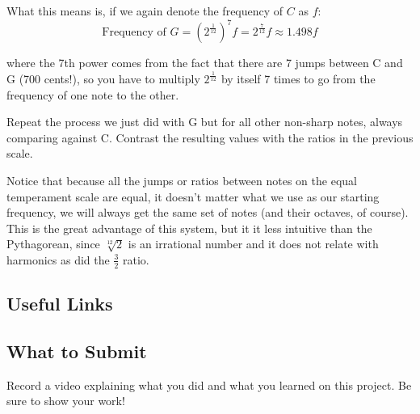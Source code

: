 \documentclass[12pt,noauthor,nooutcomes,hints,instructornotes]{ximera}%
\begin{document}
What this means is, if we again denote the frequency of $C$ as $f$:
\[
\text{Frequency of } G =\left(2^{\frac{1}{12}}\right)^7f=2^\frac{7}{12}f\approx 1.498f
\]

where the 7th power comes from the fact that there are 7 jumps between C and G (700 cents!), so you have to multiply $2^{\frac{1}{12}}$ by itself 7 times to go from the frequency of one note to the other.

\begin{question} Repeat the process we just did with G but for all other non-sharp notes, always comparing against C. Contrast the resulting values with the ratios in the previous scale.
\end{question} 

Notice that because all the jumps or ratios between notes on the equal temperament scale are equal, it doesn't matter what we use as our starting frequency, we will always get the same set of notes (and their octaves, of course). This is the great advantage of this system, but it it less intuitive than the Pythagorean, since $\sqrt[12]{2}$ is an irrational number and it does not relate with harmonics as did the $\frac{3}{2}$ ratio.



\subsection{Useful Links}



\subsection{What to Submit}
Record a video explaining what you did and what you learned on this project. Be sure to show your work!


\newpage
\end{document}
